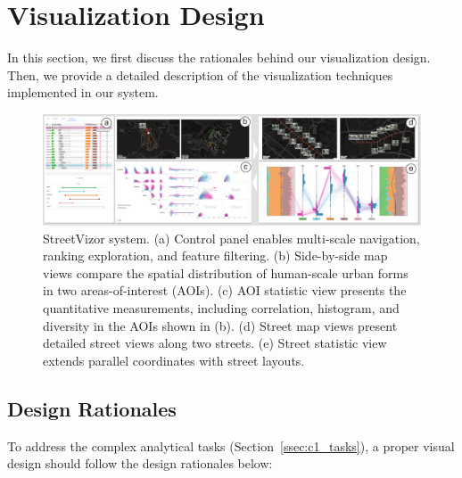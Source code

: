 \section{Visualization Design}

In this section, we first discuss the rationales behind our visualization design. 
Then, we provide a detailed description of the visualization techniques implemented in our system.


\begin{figure}[t] 
	\centering
	\includegraphics[width=0.9\columnwidth]{figure/streetvizor/fig1_teaser/teaser}
	\vspace{-3mm}
	\caption{StreetVizor system. 
		(a) Control panel enables multi-scale navigation, ranking exploration, and feature filtering.
		(b) Side-by-side map views compare the spatial distribution of human-scale urban forms in two areas-of-interest (AOIs).
		(c) AOI statistic view presents the quantitative measurements, including correlation, histogram, and diversity in the AOIs shown in (b).
		(d) Street map views present detailed street views along two streets.
		(e) Street statistic view extends parallel coordinates with street layouts.}
	\label{fig:c1_teaser}
	\vspace{-5mm}
\end{figure}



\subsection{Design Rationales}
To address the complex analytical tasks (Section~\ref{ssec:c1_tasks}), a proper visual design should follow the design rationales below:

